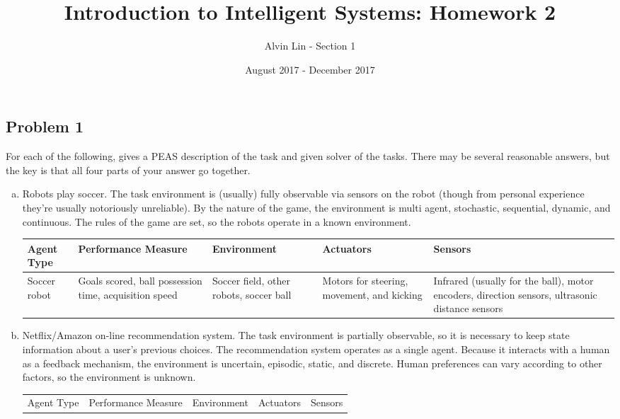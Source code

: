 \documentclass{math}
\title{Introduction to Intelligent Systems: Homework 2}
\author{Alvin Lin - Section 1}
\date{August 2017 - December 2017}
\begin{document}
\maketitle

\subsection*{Problem 1}
For each of the following, gives a PEAS description of the task and given solver
of the tasks. There may be several reasonable answers, but the key is that all
four parts of your answer go together.
\begin{enumerate}[(a)]
  \item Robots play soccer. The task environment is (usually) fully observable
  via sensors on the robot (though from personal experience they're usually
  notoriously unreliable). By the nature of the game, the environment is multi
  agent, stochastic, sequential, dynamic, and continuous. The rules of the game
  are set, so the robots operate in a known environment.
  \begin{center}
    \begin{tabular}{|p{1cm}|p{4cm}|p{4cm}|p{3cm}|p{4cm}|}
      \hline
      Agent Type & Performance Measure & Environment & Actuators & Sensors \\
      \hline
      Soccer robot &
        Goals scored, ball possession time, acquisition speed &
        Soccer field, other robots, soccer ball &
        Motors for steering, movement, and kicking &
        Infrared (usually for the ball), motor encoders, direction sensors,
        ultrasonic distance sensors \\
      \hline
    \end{tabular}
  \end{center}
  \item Netflix/Amazon on-line recommendation system. The task environment is
  partially observable, so it is necessary to keep state information about a
  user's previous choices. The recommendation system operates as a single agent.
  Because it interacts with a human as a feedback mechanism, the environment is
  uncertain, episodic, static, and discrete. Human preferences can vary
  according to other factors, so the environment is unknown.
  \begin{center}
    \begin{tabular}{|p{3cm}|p{4cm}|p{3cm}|p{3cm}|p{3cm}|}
      \hline
      Agent Type & Performance Measure & Environment & Actuators & Sensors \\

\end{tabular}
\end{center}
\end{enumerate}
\end{document}
